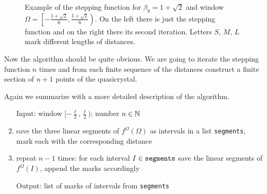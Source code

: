 \documentclass[text.tex]{subfiles}
\begin{document}
\begin{figure}[h!]
\caption{Example of the stepping function for $\beta_8 = 1+\sqrt{2}$ and window $\Omega = \left[-\frac{1+\sqrt{2}}{6},\frac{1+\sqrt{2}}{6}\right)$. On the left there is just the stepping function and on the right there its second iteration. Letters $S$, $M$, $L$ mark different lengths of distances. }%
\label{fig_steppingFunction}
\end{figure}

Now the algorithm should be quite obvious. We are going to iterate the stepping function $n$ times and from each finite sequence of the distances construct a finite section of $n+1$ points of the quasicrystal. 

Again we summarize with a more detailed description of the algorithm.

\begin{enumerate}
\item[Input:] window $[-\frac{\ell}{2},\frac{\ell}{2})$; number $n\in\mathbb{N}$
\item save the three linear segments of $f^\Omega(\Omega)$ as intervals in a list \texttt{segments}, mark each with the corresponding distance
\item repeat $n-1$ times: for each interval $I\in\text{\texttt{segments}}$ save the linear segments of $f^\Omega(I)$, append the marks accordingly
\item[Output:] list of marks of intervals from \texttt{segments}
\end{enumerate}
\end{document}
